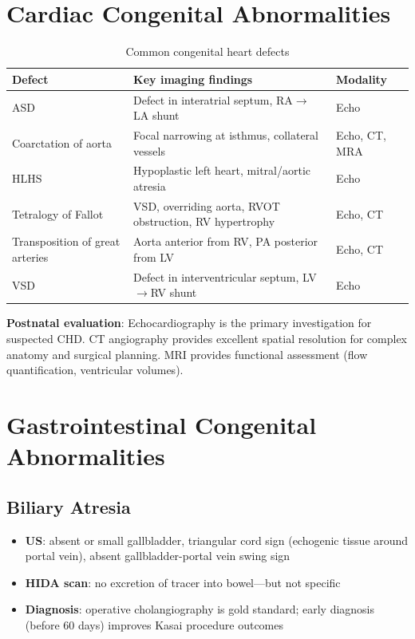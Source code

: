 \section{Cardiac Congenital Abnormalities}

\begin{table}[h]
\centering
\caption{Common congenital heart defects}
\begin{tabular}{|p{}|p{}|p{}|}
\hline
\textbf{Defect} & \textbf{Key imaging findings} & \textbf{Modality} \\
\hline
ASD & Defect in interatrial septum, RA$\rightarrow$LA shunt & Echo \\
Coarctation of aorta & Focal narrowing at isthmus, collateral vessels & Echo, CT, MRA \\
HLHS & Hypoplastic left heart, mitral/aortic atresia & Echo \\
Tetralogy of Fallot & VSD, overriding aorta, RVOT obstruction, RV hypertrophy & Echo, CT \\
Transposition of great arteries & Aorta anterior from RV, PA posterior from LV & Echo, CT \\
VSD & Defect in interventricular septum, LV$\rightarrow$RV shunt & Echo \\
\hline
\end{tabular}
\end{table}

\textbf{Postnatal evaluation}: Echocardiography is the primary investigation for suspected CHD. CT angiography provides excellent spatial resolution for complex anatomy and surgical planning. MRI provides functional assessment (flow quantification, ventricular volumes).

\section{Gastrointestinal Congenital Abnormalities}

\subsection{Biliary Atresia}
\begin{itemize}
  \item \textbf{US}: absent or small gallbladder, triangular cord sign (echogenic tissue around portal vein), absent gallbladder-portal vein swing sign
  \item \textbf{HIDA scan}: no excretion of tracer into bowel---but not specific
  \item \textbf{Diagnosis}: operative cholangiography is gold standard; early diagnosis (before 60 days) improves Kasai procedure outcomes
\end{itemize}

